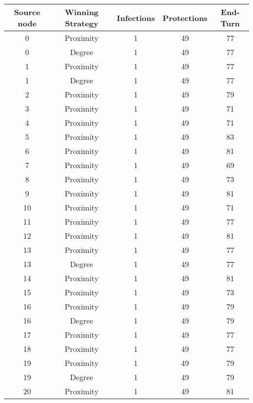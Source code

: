 \documentclass[results.tex]{subfiles}
\begin{document}
\begin{center}
  \begin{tabular}{| c || c | c | c | c |}
    \hline
    {\bfseries Source node} & {\bfseries Winning Strategy} & {\bfseries Infections} & {\bfseries Protections} & {\bfseries End-Turn} \\  %
    \hline\hline
    0 & Proximity & 1 & 49 & 77 \\ 
    \hline
    0 & Degree & 1 & 49 & 77 \\ 
    \hline
    1 & Proximity & 1 & 49 & 77 \\ 
    \hline
    1 & Degree & 1 & 49 & 77 \\ 
    \hline
    2 & Proximity & 1 & 49 & 79 \\ 
    \hline
    3 & Proximity & 1 & 49 & 71 \\ 
    \hline
    4 & Proximity & 1 & 49 & 71 \\ 
    \hline
    5 & Proximity & 1 & 49 & 83 \\ 
    \hline
    6 & Proximity & 1 & 49 & 81 \\ 
    \hline
    7 & Proximity & 1 & 49 & 69 \\ 
    \hline
    8 & Proximity & 1 & 49 & 73 \\ 
    \hline
    9 & Proximity & 1 & 49 & 81 \\ 
    \hline
    10 & Proximity & 1 & 49 & 71 \\ 
    \hline
    11 & Proximity & 1 & 49 & 77 \\ 
    \hline
    12 & Proximity & 1 & 49 & 81 \\ 
    \hline
    13 & Proximity & 1 & 49 & 77 \\ 
    \hline
    13 & Degree & 1 & 49 & 77 \\ 
    \hline
    14 & Proximity & 1 & 49 & 81 \\ 
    \hline
    15 & Proximity & 1 & 49 & 73 \\ 
    \hline
    16 & Proximity & 1 & 49 & 79 \\ 
    \hline
    16 & Degree & 1 & 49 & 79 \\ 
    \hline
    17 & Proximity & 1 & 49 & 77 \\ 
    \hline
    18 & Proximity & 1 & 49 & 77 \\ 
    \hline
    19 & Proximity & 1 & 49 & 79 \\ 
    \hline
    19 & Degree & 1 & 49 & 79 \\ 
    \hline
    20 & Proximity & 1 & 49 & 81 \\ 

\end{tabular}
\end{center}
\end{document}
